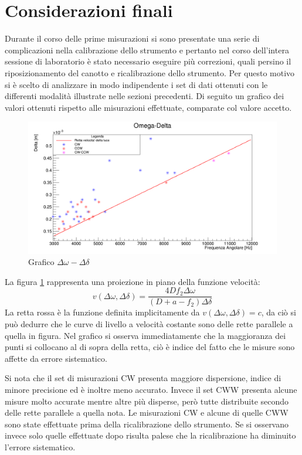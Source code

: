 \documentclass[openright]{article}
\begin{document}
    \newpage
    \section{Considerazioni finali}
    Durante il corso delle prime misurazioni si sono presentate una serie di complicazioni nella calibrazione dello strumento e pertanto nel corso dell'intera sessione di laboratorio è stato necessario eseguire più correzioni, quali persino il riposizionamento del canotto e ricalibrazione dello strumento. Per questo motivo si è scelto di analizzare in modo indipendente i set di dati ottenuti con le differenti modalità illustrate nelle sezioni precedenti.
    Di seguito un grafico  dei valori ottenuti rispetto alle misurazioni effettuate, comparate col valore accetto.
        
    \begin{figure}[H]
        \centering
        \includegraphics[scale=0.32]{../images/omega_delta_focus.png}
        \caption{Grafico $\Delta\omega-\Delta\delta$}
        \label{Omega-Delta}
    \end{figure}
    
    La figura \ref{Omega-Delta} rappresenta una proiezione in piano della funzione velocità:
    \[
    v(\Delta \omega,\Delta \delta)= \frac{4Df_2\Delta\omega}{(D+a-f_2)\Delta\delta}
    \]
    La retta {\color{Red}rossa} è la funzione definita implicitamente da $v(\Delta \omega,\Delta \delta)= c$, da ciò si può dedurre che le curve di livello a velocità costante sono delle rette parallele a quella in figura. 
    Nel grafico si osserva immediatamente che la maggioranza dei punti si collocano al di sopra della retta, ciò è indice del fatto che le misure sono affette da errore sistematico.

    Si nota che il set di misurazioni CW presenta maggiore dispersione, indice di minore precisione ed è inoltre meno accurato. Invece il set CWW presenta alcune misure molto accurate mentre altre più disperse, però tutte distribuite secondo delle rette parallele a quella nota. Le misurazioni CW e alcune di quelle CWW sono state effettuate prima della ricalibrazione dello strumento. Se si osservano invece solo quelle effettuate dopo risulta palese che la ricalibrazione ha diminuito l'errore sistematico.
\end{document}
